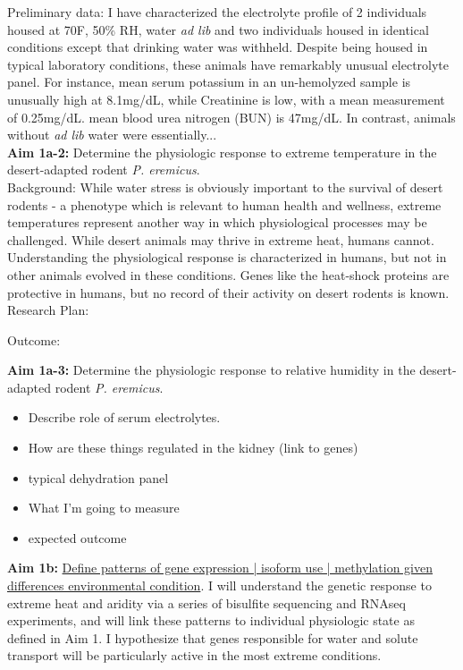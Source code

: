 \documentclass[11pt]{article}
\begin{document}
Preliminary data: I have characterized the electrolyte profile of 2 individuals housed at 70F, 50\% RH, water \textit{ad lib} and two individuals housed in identical conditions except that drinking water was withheld. Despite being housed in typical laboratory conditions, these animals have remarkably unusual electrolyte panel. For instance, mean serum potassium in an un-hemolyzed sample is unusually high at 8.1mg/dL, while Creatinine is low, with a mean measurement of 0.25mg/dL. mean blood urea nitrogen (BUN) is 47mg/dL. In contrast, animals without \textit{ad lib} water were essentially... \\   

\noindent \textbf{Aim 1a-2:} Determine the physiologic response to extreme temperature in the desert-adapted rodent \textit{P. eremicus}. \\

Background: While water stress is obviously important to the survival of desert rodents - a phenotype which is relevant to human health and wellness, extreme temperatures represent another way in which physiological processes may be challenged. While desert animals may thrive in extreme heat, humans cannot. Understanding the physiological response is characterized in humans, but not in other animals evolved in these conditions. Genes like the heat-shock proteins are protective in humans, but no record of their activity on desert rodents is known.  \\

Research Plan: 

Outcome:

\noindent \textbf{Aim 1a-3:} Determine the physiologic response to relative humidity in the desert-adapted rodent \textit{P. eremicus}. \\  

\begin{itemize}
\item Describe role of serum electrolytes.
\item How are these things regulated in the kidney (link to genes)
\item typical dehydration panel
\item What I'm going to measure
\item expected outcome
\end{itemize}



\noindent \textbf{Aim 1b:} \ul{Define patterns of gene expression | isoform use | methylation given differences environmental condition}. {I will understand the genetic response to extreme heat and aridity via a series of bisulfite sequencing and RNAseq experiments, and will link these patterns to individual physiologic state as defined in Aim 1.} I hypothesize that genes responsible for water and solute transport will be particularly active in the most extreme conditions.\\
\end{document}
